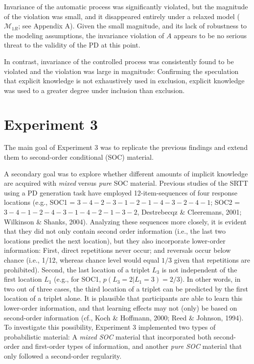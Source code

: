 \documentclass[english,,man]{apa6}
\begin{document}
Invariance of the automatic process was significantly violated, but the magnitude of the violation was small, and it disappeared entirely under a relaxed model (\(\mathcal{M}_{1R}\); see Appendix A).
Given the small magnitude, and its lack of robustness to the modeling assumptions, the invariance violation of \(A\) appears to be no serious threat to the validity of the PD at this point.

In contrast, invariance of the controlled process was consistently found to be violated and the violation was large in magnitude:
Confirming the speculation that explicit knowledge is not exhaustively used in exclusion,
explicit knowledge was used to a greater degree under inclusion than exclusion.

\hypertarget{experiment-3}{%
\section{Experiment 3}\label{experiment-3}}

The main goal of Experiment 3 was to replicate the previous findings and extend them to second-order conditional (SOC) material.

A secondary goal was to explore whether different amounts of implicit knowledge are acquired with \emph{mixed} versus \emph{pure} SOC material.
Previous studies of the SRTT using a PD generation task have employed 12-item-sequences of four response locations (e.g., SOC1 = \(3{-}4{-}2{-}3{-}1{-}2{-}1{-}4{-}3{-}2{-}4{-}1\); SOC2 = \(3{-}4{-}1{-}2{-}4{-}3{-}1{-}4{-}2{-}1{-}3{-}2\), Destrebecqz \& Cleeremans, 2001; Wilkinson \& Shanks, 2004).
Analyzing these sequences more closely, it is evident that they did not only contain second order information (i.e., the last two locations predict the next location), but they also incorporate lower-order information:
First, direct repetitions never occur; and reversals occur below chance (i.e., 1/12, whereas chance level would equal \(1/3\) given that repetitions are prohibited).
Second, the last location of a triplet \(L_3\) is not independent of the first location \(L_1\) (e.g., for SOC1, \(p(L_3 = 2 | L_1 = 3) = 2/3\)).
In other words, in two out of three cases, the third location of a triplet can be predicted by the first location of a triplet alone.
It is plausible that participants are able to learn this lower-order information, and that learning effects may not (only) be based on second-order information (cf., Koch \& Hoffmann, 2000; Reed \& Johnson, 1994).
To investigate this possibility, Experiment 3 implemented two types of probabilistic material:
A \emph{mixed SOC} material that incorporated both second-order and first-order types of information, and another \emph{pure SOC} material that only followed a second-order regularity.
\end{document}
